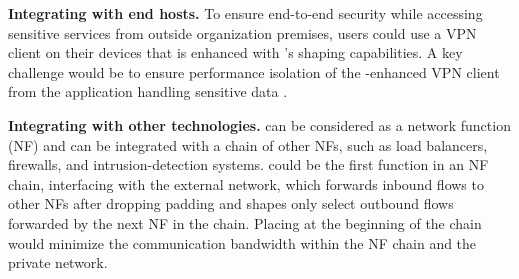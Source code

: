 \textbf{Integrating {\sys} with end hosts.}
To ensure end-to-end security while accessing sensitive services from outside
organization premises, users could use a VPN client on their devices that is
enhanced with {\sys}'s shaping capabilities. A key challenge would be to ensure
performance isolation of the {\sys}-enhanced VPN client from the application
handling sensitive data \cite{mehta2022pacer}.

\textbf{Integrating {\sys} with other technologies.}
{\sys} can be considered as a network function (NF) and can be integrated with a
chain of other NFs, such as load balancers, firewalls, and intrusion-detection
systems. {\sys} could be the first function in an NF chain, interfacing with the
external network, which forwards inbound flows to other NFs after dropping
padding and shapes only select outbound flows forwarded by the next NF in the
chain. Placing {\sys} at the beginning of the chain would minimize the
communication bandwidth within the NF chain and the private network.


